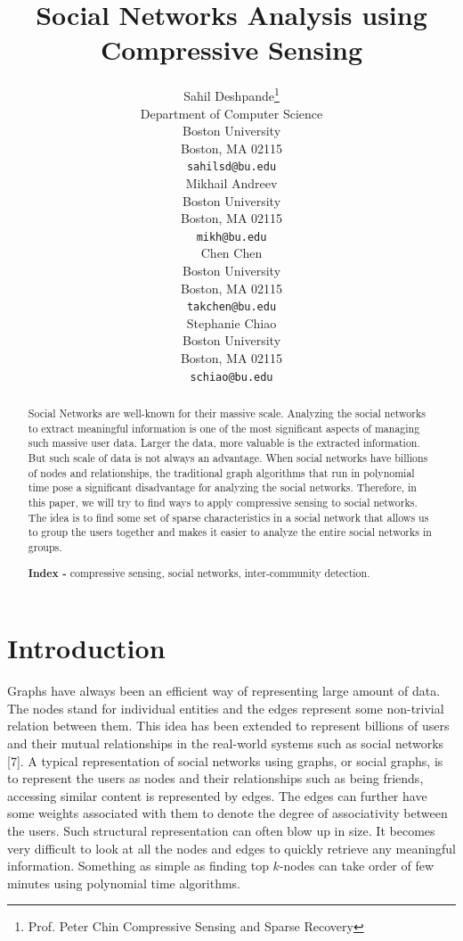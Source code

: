 \documentclass{article}
\title{Social Networks Analysis using Compressive Sensing}
\author{
  Sahil Deshpande\thanks{Prof. Peter Chin
    Compressive Sensing and Sparse Recovery} \\
  Department of Computer Science\\
  Boston University\\
  Boston, MA 02115 \\
  \texttt{sahilsd@bu.edu} \\
  \And
  Mikhail Andreev \\
  Boston University \\
  Boston, MA 02115 \\
  \texttt{mikh@bu.edu} \\
  \AND
  Chen Chen \\
  Boston University \\
  Boston, MA 02115 \\
  \texttt{takchen@bu.edu} \\
  \And
  Stephanie Chiao \\
  Boston University \\
  Boston, MA 02115 \\
  \texttt{schiao@bu.edu} \\
}
\begin{document}

\maketitle

\begin{abstract}
Social Networks are well-known for their massive scale. Analyzing the social networks to extract meaningful information
is one of the most significant aspects of managing such massive user data. Larger the data, more valuable is the
extracted information. But such scale of data is not always an advantage. When social networks have billions of nodes
and relationships, the traditional graph algorithms that run in polynomial time pose a significant disadvantage for
analyzing the social networks. Therefore, in this paper, we will try to find ways to apply compressive sensing to social
networks. The idea is to find some set of sparse characteristics in a social network that allows us to group the users
together and makes it easier to analyze the entire social networks in groups.

\textbf{Index - } compressive sensing, social networks, inter-community detection.
\end{abstract}

\section{Introduction}
Graphs have always been an efficient way of representing large amount of data. The nodes stand for individual entities
and the edges represent some non-trivial relation between them. This idea has been extended to represent billions of
users and their mutual relationships in the real-world systems such as social networks [7]. A typical representation of
social networks using graphs, or social graphs, is to represent the users as nodes and their relationships such as being
friends, accessing similar content is represented by edges. The edges can further have some weights associated with them
to denote the degree of associativity between the users. Such structural representation can often blow up in size. It
becomes very difficult to look at all the nodes and edges to quickly retrieve any meaningful information. Something as
simple as finding top $k$-nodes can take order of few minutes using polynomial time algorithms. 
\end{document}
